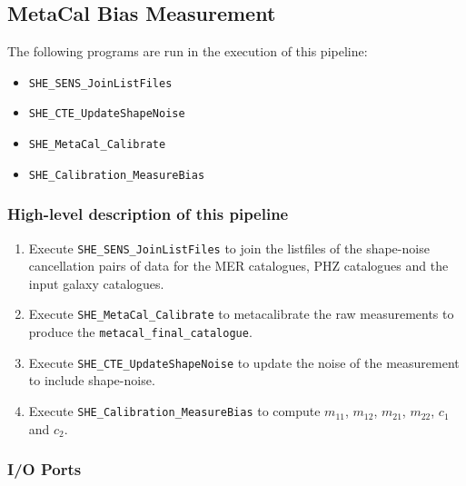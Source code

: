 \documentclass[11pt]{EuclidVIS}
\numberwithin{table}{section}
\numberwithin{figure}{section}
\begin{document}
\subsection{MetaCal Bias Measurement}






The following programs are run in the execution of this pipeline:

\begin{itemize}
    \item \texttt{SHE\_SENS\_JoinListFiles}
    \item \texttt{SHE\_CTE\_UpdateShapeNoise}
    \item \texttt{SHE\_MetaCal\_Calibrate}
    \item \texttt{SHE\_Calibration\_MeasureBias}
\end{itemize}

\subsubsection{High-level description of this pipeline}

\begin{enumerate}
    \item Execute \texttt{SHE\_SENS\_JoinListFiles} to join the listfiles of the shape-noise cancellation pairs of data for the MER catalogues, PHZ catalogues and the input galaxy catalogues.
    \item Execute \texttt{SHE\_MetaCal\_Calibrate} to metacalibrate the raw measurements to produce
    the \texttt{metacal\_final\_catalogue}.
    \item Execute \texttt{SHE\_CTE\_UpdateShapeNoise} to update the noise of the measurement to include shape-noise.
    \item Execute \texttt{SHE\_Calibration\_MeasureBias} to compute $m_{11}$, $m_{12}$, $m_{21}$, $m_{22}$, $c_{1}$ and $c_{2}$.
\end{enumerate}

\subsubsection{I/O Ports}
\end{document}
